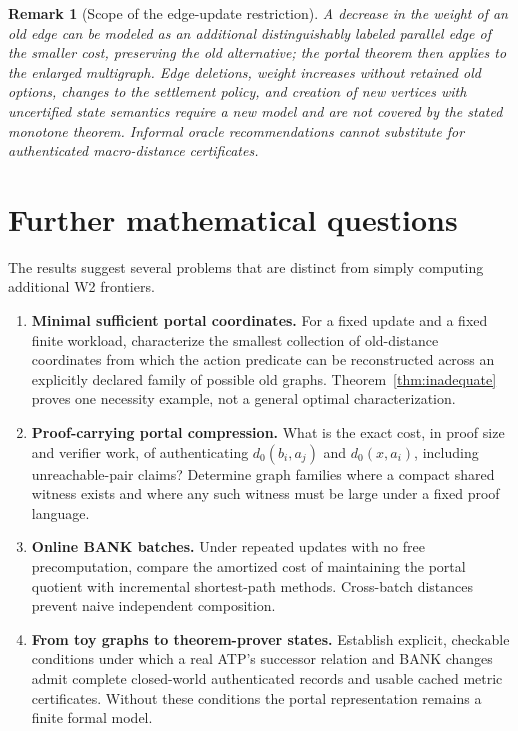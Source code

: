 \documentclass[11pt,letterpaper]{article}
\newtheorem{remark}[theorem]{Remark}
\begin{document}
\begin{remark}[Scope of the edge-update restriction]
A decrease in the weight of an old edge can be modeled as an additional distinguishably labeled parallel edge of the smaller cost, preserving the old alternative; the portal theorem then applies to the enlarged multigraph. Edge deletions, weight increases without retained old options, changes to the settlement policy, and creation of new vertices with uncertified state semantics require a new model and are not covered by the stated monotone theorem. Informal oracle recommendations cannot substitute for authenticated macro-distance certificates.
\end{remark}

\section{Further mathematical questions}
The results suggest several problems that are distinct from simply computing additional W2 frontiers.
\begin{enumerate}[label=Q\arabic*.]
\item \textbf{Minimal sufficient portal coordinates.} For a fixed update and a fixed finite workload, characterize the smallest collection of old-distance coordinates from which the action predicate can be reconstructed across an explicitly declared family of possible old graphs. Theorem~\ref{thm:inadequate} proves one necessity example, not a general optimal characterization.
\item \textbf{Proof-carrying portal compression.} What is the exact cost, in proof size and verifier work, of authenticating $d_0(b_i,a_j)$ and $d_0(x,a_i)$, including unreachable-pair claims? Determine graph families where a compact shared witness exists and where any such witness must be large under a fixed proof language.
\item \textbf{Online BANK batches.} Under repeated updates with no free precomputation, compare the amortized cost of maintaining the portal quotient with incremental shortest-path methods. Cross-batch distances prevent naive independent composition.
\item \textbf{From toy graphs to theorem-prover states.} Establish explicit, checkable conditions under which a real ATP's successor relation and BANK changes admit complete closed-world authenticated records and usable cached metric certificates. Without these conditions the portal representation remains a finite formal model.
\end{enumerate}
\end{document}
